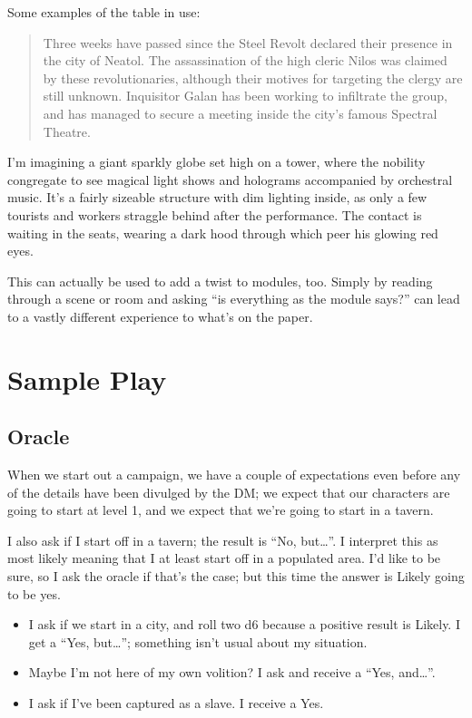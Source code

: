 \documentclass[12pt, letterpaper]{article}
\begin{document}
Some examples of the table in use:

\begin{quote}
Three weeks have passed since the Steel Revolt declared their presence in the city of Neatol. The assassination of the high cleric Nilos was claimed by these revolutionaries, although their motives for targeting the clergy are still unknown. Inquisitor Galan has been working to infiltrate the group, and has managed to secure a meeting inside the city's famous Spectral Theatre.
\end{quote}

I'm imagining a giant sparkly globe set high on a tower, where the nobility congregate to see magical light shows and holograms accompanied by orchestral music. It's a fairly sizeable structure with dim lighting inside, as only a few tourists and workers straggle behind after the performance. The contact is waiting in the seats, wearing a dark hood through which peer his glowing red eyes.


This can actually be used to add a twist to modules, too. Simply by reading through a scene or room and asking ``is everything as the module says?'' can lead to a vastly different experience to what's on the paper.

\section*{Sample Play}

\subsection*{Oracle}

When we start out a campaign, we have a couple of expectations even before any of the details have been divulged by the DM; we expect that our characters are going to start at level 1, and we expect that we're going to start in a tavern.

I also ask if I start off in a tavern; the result is ``No, but\ldots''. I interpret this as most likely meaning that I at least start off in a populated area. I'd like to be sure, so I ask the oracle if that's the case; but this time the answer is Likely going to be yes.

\begin{itemize}[noitemsep, topsep=0pt]
\item I ask if we start in a city, and roll two d6 because a positive result is Likely. I get a ``Yes, but\ldots''; something isn't usual about my situation.
\item Maybe I'm not here of my own volition? I ask and receive a ``Yes, and\ldots''.
\item I ask if I've been captured as a slave. I receive a Yes.
\end{itemize}
\end{document}
